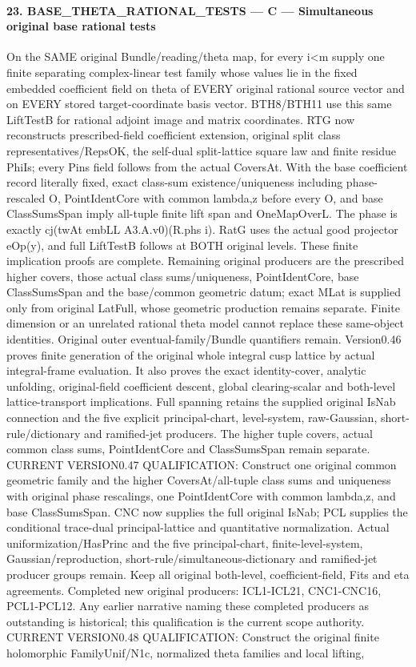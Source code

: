 \paragraph{23. BASE\_\allowbreak THETA\_\allowbreak RATIONAL\_\allowbreak TESTS — C — Simultaneous original base rational tests}

On the SAME original Bundle/reading/theta map, for every i<m supply one finite separating complex-linear test family whose values lie in the fixed embedded coefficient field on theta of EVERY original rational source vector and on EVERY stored target-coordinate basis vector. BTH8/BTH11 use this same LiftTestB for rational adjoint image and matrix coordinates. RTG now reconstructs prescribed-field coefficient extension, original split class representatives/RepsOK, the self-dual split-lattice square law and finite residue PhiIs; every Pins field follows from the actual CoversAt. With the base coefficient record literally fixed, exact class-sum existence/uniqueness including phase-rescaled O, PointIdentCore with common lambda,z before every O, and base ClassSumsSpan imply all-tuple finite lift span and OneMapOverL. The phase is exactly cj(twAt embLL A3.A.v0)(R.phs i). RatG uses the actual good projector eOp(y), and full LiftTestB follows at BOTH original levels. These finite implication proofs are complete. Remaining original producers are the prescribed higher covers, those actual class sums/uniqueness, PointIdentCore, base ClassSumsSpan and the base/common geometric datum; exact MLat is supplied only from original LatFull, whose geometric production remains separate. Finite dimension or an unrelated rational theta model cannot replace these same-object identities. Original outer eventual-family/Bundle quantifiers remain. Version0.46 proves finite generation of the original whole integral cusp lattice by actual integral-frame evaluation. It also proves the exact identity-cover, analytic unfolding, original-field coefficient descent, global clearing-scalar and both-level lattice-transport implications. Full spanning retains the supplied original IsNab connection and the five explicit principal-chart, level-system, raw-Gaussian, short-rule/dictionary and ramified-jet producers. The higher tuple covers, actual common class sums, PointIdentCore and ClassSumsSpan remain separate. CURRENT VERSION0.47 QUALIFICATION: Construct one original common geometric family and the higher CoversAt/all-tuple class sums and uniqueness with original phase rescalings, one PointIdentCore with common lambda,z, and base ClassSumsSpan. CNC now supplies the full original IsNab; PCL supplies the conditional trace-dual principal-lattice and quantitative normalization. Actual uniformization/HasPrinc and the five principal-chart, finite-level-system, Gaussian/reproduction, short-rule/simultaneous-dictionary and ramified-jet producer groups remain. Keep all original both-level, coefficient-field, Fits and eta agreements. Completed new original producers: ICL1-ICL21, CNC1-CNC16, PCL1-PCL12. Any earlier narrative naming these completed producers as outstanding is historical; this qualification is the current scope authority. CURRENT VERSION0.48 QUALIFICATION: Construct the original finite holomorphic FamilyUnif/N1c, normalized theta families and local lifting, 